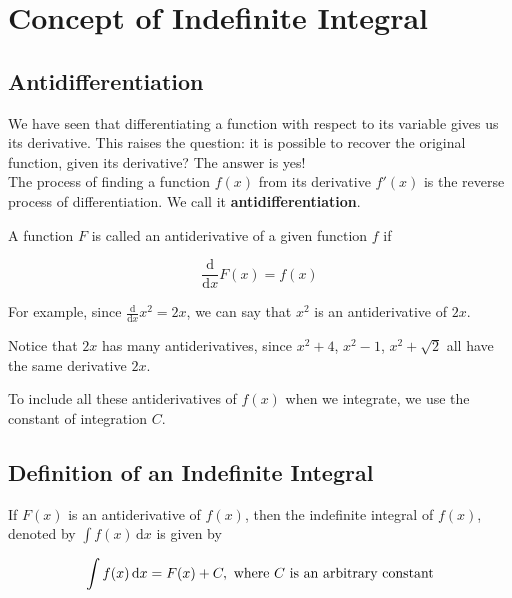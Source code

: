 \documentclass[11pt,a4paper]{book}
\begin{document}
\section{Concept of Indefinite Integral}

\subsection{Antidifferentiation}

We have seen that differentiating a function with respect to its variable
gives us its derivative. This raises the question: it is
possible to recover the original function, given its derivative?  The answer is yes! \\ The process of finding a function $f\left(x\right)$ from its derivative $f'\left(x\right)$ is the reverse process of differentiation. We call it \textbf{antidifferentiation}.

\begin{tcolorbox}[colback=blue!5, colframe=black, boxrule=.4pt, sharpish corners]

A function $F$ is called an antiderivative of a given function $f$
if

\[
\frac{\mathrm{d}}{\mathrm{d}x}F\left(x\right)=f\left(x\right)
\]
\end{tcolorbox}

For example, since ${\displaystyle \frac{\mathrm{d}}{\mathrm{d}x}x^{2}=2x}$,
we can say that $x^{2}$ is an antiderivative of $2x$.

Notice that $2x$ has many antiderivatives, since $x^{2}+4$, $x^{2}-1$,
$x^{2}+\sqrt{2}$ all have the same derivative $2x$.

To include all these antiderivatives of $f(x)$ when we integrate,
we use the constant of integration $C$.

\subsection{Definition of an Indefinite Integral}

\begin{tcolorbox}[colback=blue!5, colframe=black, boxrule=.4pt, sharpish corners]

If $F(x)$ is an antiderivative of $f(x)$, then the indefinite integral
of $f(x)$, denoted by ${\displaystyle \int f(x)\, \mathrm{d}x}$ is given by

\[
\int f(x)\, \mathrm{d}x=F(x)+C,\text{ where \ensuremath{C} is an arbitrary constant}
\]
\end{tcolorbox}
\end{document}
